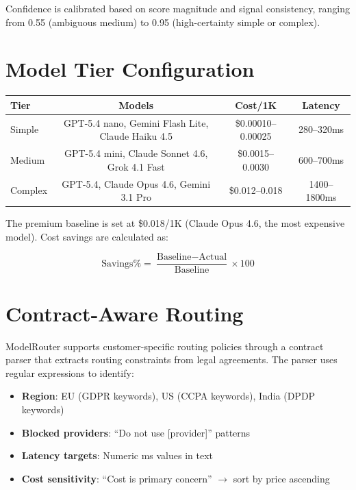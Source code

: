\documentclass[11pt,a4paper]{article}
\begin{document}
Confidence is calibrated based on score magnitude and signal consistency, ranging from 0.55 (ambiguous medium) to 0.95 (high-certainty simple or complex).

\section{Model Tier Configuration}

\begin{center}
\begin{tabular}{l|c|c|c}
\textbf{Tier} & \textbf{Models} & \textbf{Cost/1K} & \textbf{Latency} \\
\hline
Simple & GPT-5.4 nano, Gemini Flash Lite, Claude Haiku 4.5 & \$0.00010--0.00025 & 280--320ms \\
Medium & GPT-5.4 mini, Claude Sonnet 4.6, Grok 4.1 Fast & \$0.0015--0.0030 & 600--700ms \\
Complex & GPT-5.4, Claude Opus 4.6, Gemini 3.1 Pro & \$0.012--0.018 & 1400--1800ms \\
\end{tabular}
\end{center}

The premium baseline is set at \$0.018/1K (Claude Opus 4.6, the most expensive model). Cost savings are calculated as:

\begin{equation}
\text{Savings\%} = \frac{\text{Baseline} - \text{Actual}}{\text{Baseline}} \times 100
\end{equation}

\section{Contract-Aware Routing}

ModelRouter supports customer-specific routing policies through a contract parser that extracts routing constraints from legal agreements. The parser uses regular expressions to identify:

\begin{itemize}
    \item \textbf{Region}: EU (GDPR keywords), US (CCPA keywords), India (DPDP keywords)
    \item \textbf{Blocked providers}: ``Do not use [provider]'' patterns
    \item \textbf{Latency targets}: Numeric ms values in text
    \item \textbf{Cost sensitivity}: ``Cost is primary concern'' $\rightarrow$ sort by price ascending
\end{itemize}
\end{document}

